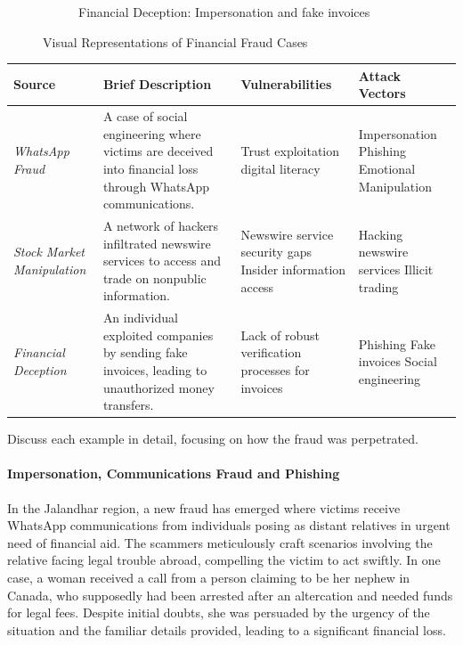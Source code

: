 \documentclass[11pt]{article}
\begin{document}
\begin{figure}[ht]
\begin{subfigure}{.3\textwidth}
      \caption{Financial Deception: Impersonation and fake invoices}
      \label{fig:sub3}
    \end{subfigure}
    \caption{Visual Representations of Financial Fraud Cases}
    \label{fig:test}
    \end{figure}

\begin{tabular}{@{}p{2cm}p{3cm}p{3cm}p{3cm}@{}}
\toprule
\textbf{Source} & \textbf{Brief Description} & \textbf{Vulnerabilities} & \textbf{Attack Vectors} \\ \midrule
\textit{WhatsApp Fraud} & A case of social engineering where victims are deceived into financial loss through WhatsApp communications. & Trust exploitation \newline digital literacy & Impersonation \newline Phishing \newline Emotional Manipulation\\
\textit{Stock Market Manipulation} & A network of hackers infiltrated newswire services to access and trade on nonpublic information. &  Newswire service security gaps \newline Insider information access & Hacking newswire services \newline Illicit trading \\
\textit{Financial Deception} & An individual exploited companies by sending fake invoices, leading to unauthorized money transfers. & Lack of robust verification processes for invoices & Phishing \newline Fake invoices \newline Social engineering \\
\bottomrule
\end{tabular}
        

Discuss each example in detail, focusing on how the fraud was perpetrated.
\paragraph*{Impersonation, Communications Fraud and Phishing}
In the Jalandhar region, a new fraud has emerged where victims receive WhatsApp communications from individuals posing as distant relatives in urgent need of financial aid. The scammers meticulously craft scenarios involving the relative facing legal trouble abroad, compelling the victim to act swiftly. In one case, a woman received a call from a person claiming to be her nephew in Canada, who supposedly had been arrested after an altercation and needed funds for legal fees. Despite initial doubts, she was persuaded by the urgency of the situation and the familiar details provided, leading to a significant financial loss.
\end{document}
